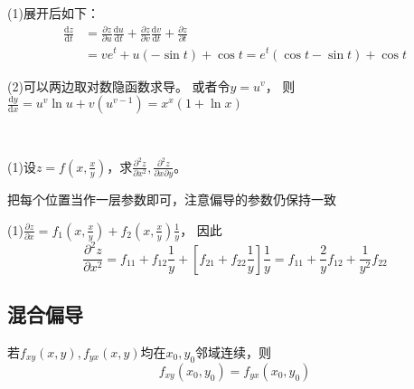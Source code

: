 \begin{solution}
  (1)展开后如下：
  \begin{align*}
    \frac{\mathrm{d} z }{\mathrm{d} t} &= \frac{\partial z}{\partial u} \frac{\mathrm{d} u}{\mathrm{d} t} + \frac{\partial z}{\partial v}\frac{\mathrm{d}v}{\mathrm{d} t} + \frac{\partial z}{\partial t}\\
    &= ve^t + u(-\sin t) + \cos t = e^t(\cos t - \sin t) + \cos t
  \end{align*}

  (2)可以两边取对数隐函数求导。
  或者令$y = u^v$，
  则$\frac{\mathrm{d} y}{\mathrm{d} x} = u^v \ln u + v (u^{v-1}) = x^x(1 + \ln x)$
\end{solution}

~

\begin{exercise}[高阶偏导]
  (1)设$z = f \left( x, \frac{x}{y} \right)$，求$\frac{\partial^2 z}{\partial x^2}, \frac{\partial^2 z}{\partial x \partial y}$。
\end{exercise}

\begin{solution}
  把每个位置当作一层参数即可，注意偏导的参数仍保持一致

  (1)$\frac{\partial z}{\partial x} = f_1(x, \frac{x}{y}) + f_2(x,\frac{x}{y}) \frac{1}{y}$，
  因此
  \begin{equation*}
    \frac{\partial^2 z }{\partial x^2} = f_{11} + f_{12}\frac{1}{y} + \left[ f_{21}+f_{22}\frac{1}{y} \right]\frac{1}{y} = f_{11} + \frac{2}{y}f_{12}+\frac{1}{y^2}f_{22}
  \end{equation*}
\end{solution}



\subsection{混合偏导}

\begin{theorem}[混合偏导定理]
  若$f_{xy}(x,y), f_{yx}(x,y)$均在$x_0,y_0$邻域连续，则
  \begin{equation*}
    f_{xy}(x_0,y_0) = f_{yx}(x_0,y_0)
  \end{equation*}
\end{theorem}


